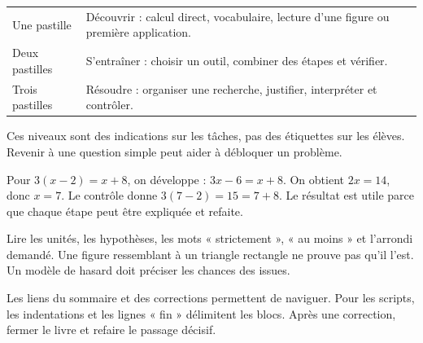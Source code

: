 \clearpage\thispagestyle{otFront}\label{mode-emploi}\fontsize{11}{15}\selectfont

\begin{tabularx}{\linewidth}{@{}lY@{}}\toprule
Une pastille & Découvrir : calcul direct, vocabulaire, lecture d’une figure ou première application.\\[3mm]
Deux pastilles & S’entraîner : choisir un outil, combiner des étapes et vérifier.\\[3mm]
Trois pastilles & Résoudre : organiser une recherche, justifier, interpréter et contrôler.\\\bottomrule
\end{tabularx}\par\medskip
Ces niveaux sont des indications sur les tâches, pas des étiquettes sur les
élèves. Revenir à une question simple peut aider à débloquer un problème.\par\medskip
\begin{exemple}Pour $3(x-2)=x+8$, on développe : $3x-6=x+8$. On obtient $2x=14$, donc $x=7$. Le contrôle donne $3(7-2)=15=7+8$. Le résultat est utile parce que chaque étape peut être expliquée et refaite.\end{exemple}
\begin{attention}Lire les unités, les hypothèses, les mots « strictement », « au moins » et l’arrondi demandé. Une figure ressemblant à un triangle rectangle ne prouve pas qu’il l’est. Un modèle de hasard doit préciser les chances des issues.\end{attention}
Les liens du sommaire et des corrections permettent de naviguer. Pour les
scripts, les indentations et les lignes « fin » délimitent les blocs.
Après une correction, fermer le livre et refaire le passage décisif.

\clearpage
